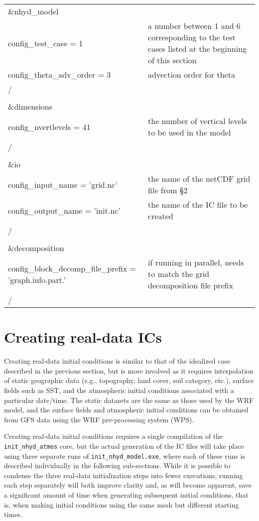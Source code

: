 \begin{longtable}{p{3in}|p{3.25in}}

\&nhyd\_model\\
   config\_test\_case       = 1                      & a number between 1 and 6 corresponding to the test cases listed at the beginning of this section\\
   config\_theta\_adv\_order = 3                     & advection order for theta \\
/\\
\\
\&dimensions\\
   config\_nvertlevels     = 41                      & the number of vertical levels to be used in the model \\
/\\
\\
\&io\\
   config\_input\_name         = 'grid.nc'           & the name of the netCDF grid file from \S2 \\
   config\_output\_name        = 'init.nc'           & the name of the IC file to be created \\
/\\
\\
\&decomposition\\
   config\_block\_decomp\_file\_prefix = 'graph.info.part.' & if running in parallel, needs to match the grid decomposition file prefix \\
/\\

\end{longtable}



\section{Creating real-data ICs}

Creating real-data initial conditions is similar to that of the idealized case described in the previous section, but is more involved as it requires interpolation of static geographic data (e.g., topography, land cover, soil category, etc.), surface fields such as SST, and the atmospheric initial conditions associated with a particular date/time.  The static datasets are the same as those used by the WRF model, and the surface fields and atmospheric initial conditions can be obtained from GFS data using the WRF pre-processing system (WPS).

Creating real-data initial conditions requires a single compilation of the {\tt init\_nhyd\_atmos} core, but the actual generation of the IC files will take place using three separate runs of {\tt init\_nhyd\_model.exe}, where each of these runs is described individually in the following sub-sections.  While it is possible to condense the three real-data initialization steps into fewer executions, running each step separately will both improve clarity and, as will become apparent, save a significant amount of time when generating subsequent initial conditions, that is, when making initial conditions using the same mesh but different starting times.

